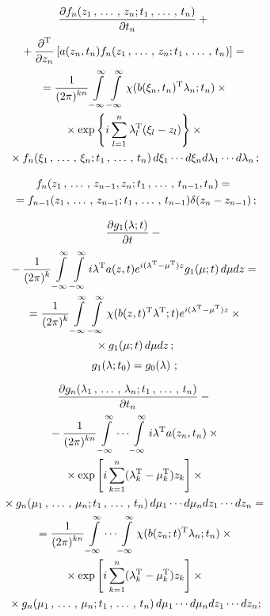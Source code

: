 \begin{multicols}{2}
    \vspace*{-12pt}
    
    \begin{multline*}
\displaystyle\frac{\displaystyle \partial f_n(z_1\,,\,\ldots\,,\, z_n;t_1\,,\,\ldots\,,\, t_n)\mathstrut}{\displaystyle \partial t_n\mathstrut}+{}\\
{}+\displaystyle\frac{\displaystyle \partial^{\mathrm{T}}\mathstrut}{\displaystyle \partial z_n\mathstrut}\left[
a(z_n, t_n) f_n (z_1\,,\,\ldots\,,\, z_n; t_1\,,\,\ldots\,,\, t_n)\right]={}\\
{}= \displaystyle\frac{\displaystyle 1\mathstrut}{\displaystyle (2\pi)^{kn}\mathstrut} \int\limits_{-\infty}^\infty\int\limits_{-\infty}^\infty \chi(b(\xi_n, t_n)^{\mathrm{T}} \lambda_n;t_n) \times{}\\
{}\times \exp\left\{ i \sum\limits_{l=1}^n \lambda_l^{\mathrm{T}} (\xi_l-z_l)\right\} \times{}\\
{}\times
f_n (\xi_1\,,\,\ldots\,,\, \xi_n; t_1\,,\,\ldots\,,\, t_n)\,d\xi_1\cdots d\xi_n d\lambda_1\cdots d\lambda_n\,;
\end{multline*}

\vspace*{-12pt}

\begin{multline*}
f_n(z_1\,,\,\ldots\,,\, z_{n-1},z_n;t_1\,,\,\ldots\,,\, t_{n-1},t_{n})={}\\
{}= f_{n-1} (z_1\,,\,\ldots\,,\, z_{n-1};t_1\,,\,\ldots\,,\, t_{n-1})\delta (z_n - z_{n-1})\,;
\end{multline*}
       
        
\noindent        
\begin{multline}
\fr{\prt g_1 (\la;t)}{\prt t} -{}\\
{}-\fr{1}{(2\pi)^k} \iin \iin i\la^{\mathrm{T}} a (z,t) 
e^{i(\la^{\mathrm{T}} -\mu^{\mathrm{T}})z} g_1 (\mu;t)\, d\mu dz={}\\
{}=\fr{1}{(2\pi)^k} \iin \iin \chi(b(z,t)^{\mathrm{T}} \la^{\mathrm{T}};t) 
e^{i(\la^{\mathrm{T}} -\mu^{\mathrm{T}})z} \times{}\\
{}\times
g_1 (\mu;t)\, d\mu dz\,;
\label{e1.7-sin}
\end{multline}
\begin{equation}
g_1(\lambda;t_0) = g_0(\lambda)\,\,; \label{e1.8-sin}
\end{equation}

\vspace*{-12pt}

\begin{multline*}
\displaystyle\frac{\displaystyle \partial g_n (\lambda_1\,,\,\ldots\,,\, \lambda_n; t_1\,,\,\ldots\,,\, t_n)\mathstrut}{\displaystyle \partial t_n\mathstrut} -{}\\
{}-
\displaystyle\frac{\displaystyle 1\mathstrut}{\displaystyle (2\pi)^{kn}\mathstrut} \int\limits_{-\infty}^\infty \cdots \int\limits_{-\infty}^\infty i\lambda^{\mathrm{T}} a (z_n,t_n) \times{}\\
{}\times \exp \left[ i \sum\limits\limits_{k=1}^n (\lambda_k^{\mathrm{T}} - \mu_k^{\mathrm{T}}) z_k\right] \times{}\\
{}\times g_n 
(\mu_1\,,\,\ldots\,,\, \mu_n; t_1\,,\,\ldots\,,\, t_n)\, d\mu_1 \cdots d \mu_n dz_1\cdots dz_n={}\\
{}= \displaystyle\frac{\displaystyle 1\mathstrut}{\displaystyle (2\pi)^{kn}\mathstrut} \int\limits_{-\infty}^\infty\cdots \int\limits_{-\infty}^\infty \chi (b(z_n;t)^{\mathrm{T}} \lambda_n;t_n)\times{}\\
{}\times\exp \left[ i \sum\limits_{k=1}^n (\lambda_k^{\mathrm{T}} - \mu_k^{\mathrm{T}}) z_k\right] \times{}\\
{}\times g_n 
(\mu_1\,,\,\ldots\,,\, \mu_n; t_1\,,\,\ldots\,,\, t_n) \,d\mu_1 \cdots d \mu_n dz_1\cdots dz_n;
\end{multline*}


\end{multicols}
